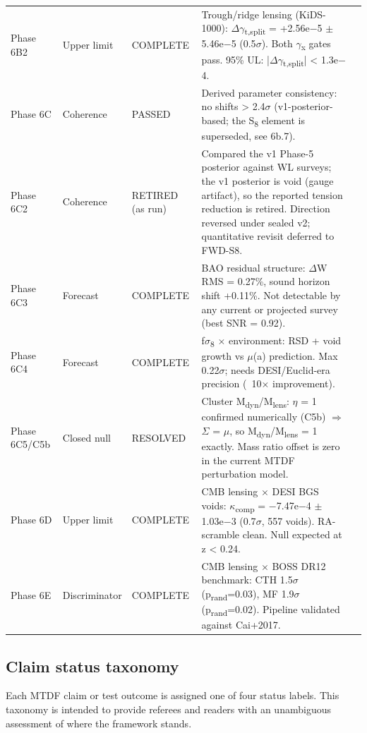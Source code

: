 \documentclass[11pt,a4paper]{article}
\begin{document}
\begin{xltabular}{\linewidth}{>{\RaggedRight\arraybackslash}X>{\RaggedRight\arraybackslash}X>{\RaggedRight\arraybackslash}X>{\RaggedRight\arraybackslash}X>{\RaggedRight\arraybackslash}X}
Phase 6B2 & Upper limit & COMPLETE & Trough/\allowbreak{}ridge lensing (KiDS-1000): $\Delta$$\gamma$\textsubscript{t,split} = +2.56e$-$5 $\pm$ 5.46e$-$5 (0.5$\sigma$). Both $\gamma$\textsubscript{x} gates pass. 95\% UL: |$\Delta$$\gamma$\textsubscript{t,split}| < 1.3e$-$4. &  \tabularnewline
Phase 6C & Coherence & PASSED & Derived parameter consistency: no shifts > 2.4$\sigma$ (v1-posterior-based; the S\textsubscript{8} element is superseded, see 6b.7). &  \tabularnewline
Phase 6C2 & Coherence & RETIRED (as run) & Compared the v1 Phase-5 posterior against WL surveys; the v1 posterior is void (gauge artifact), so the reported tension reduction is retired. Direction reversed under sealed v2; quantitative revisit deferred to FWD-S8. &  \tabularnewline
Phase 6C3 & Forecast & COMPLETE & BAO residual structure: $\Delta$W RMS = 0.27\%, sound horizon shift +0.11\%. Not detectable by any current or projected survey (best SNR = 0.92). &  \tabularnewline
Phase 6C4 & Forecast & COMPLETE & f$\sigma$\textsubscript{8} $\times$ environment: RSD + void growth vs $\mu$(a) prediction. Max 0.22$\sigma$; needs DESI/\allowbreak{}Euclid-era precision (\ {}10$\times$ improvement). &  \tabularnewline
Phase 6C5/\allowbreak{}C5b & Closed null & RESOLVED & Cluster M\textsubscript{dyn}/M\textsubscript{lens}: $\eta$ = 1 confirmed numerically (C5b) $\Rightarrow$ $\Sigma$ = $\mu$, so M\textsubscript{dyn}/M\textsubscript{lens} = 1 exactly. Mass ratio offset is zero in the current MTDF perturbation model. &  \tabularnewline
Phase 6D & Upper limit & COMPLETE & CMB lensing $\times$ DESI BGS voids: $\kappa$\textsubscript{comp} = $-$7.47e$-$4 $\pm$ 1.03e$-$3 (0.7$\sigma$, 557 voids). RA-scramble clean. Null expected at z < 0.24. &  \tabularnewline
Phase 6E & Discriminator & COMPLETE & CMB lensing $\times$ BOSS DR12 benchmark: CTH 1.5$\sigma$ (p\textsubscript{rand}=0.03), MF 1.9$\sigma$ (p\textsubscript{rand}=0.02). Pipeline validated against Cai+2017. &  \tabularnewline
\end{xltabular}
\endgroup

\subsection{Claim status taxonomy}
Each MTDF claim or test outcome is assigned one of four status labels. This taxonomy is intended to provide referees and readers with an unambiguous assessment of where the framework stands.
\end{document}
